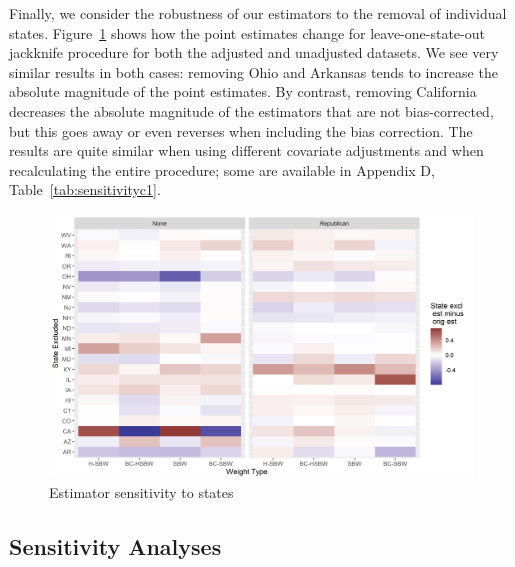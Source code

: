 \documentclass[12pt]{article}
\begin{document}
Finally, we consider the robustness of our estimators to the removal of individual states. Figure~\ref{fig:loostateplot} shows how the point estimates change for leave-one-state-out jackknife procedure for both the adjusted and unadjusted datasets. We see very similar results in both cases: removing Ohio and Arkansas tends to increase the absolute magnitude of the point estimates. By contrast, removing California decreases the absolute magnitude of the estimators that are not bias-corrected, but this goes away or even reverses when including the bias correction. The results are quite similar when using different covariate adjustments and when recalculating the entire procedure; some are available in Appendix D, Table~\ref{tab:sensitivityc1}. 

\begin{figure}[]
\begin{center}
    \includegraphics[scale=0.6]{01_Plots/c1-loostate-sensitivity.png}
    \caption{Estimator sensitivity to states}
    \label{fig:loostateplot}
\end{center}
\end{figure}

\subsection{Sensitivity Analyses} \label{sssec:sensitivity}
\end{document}
